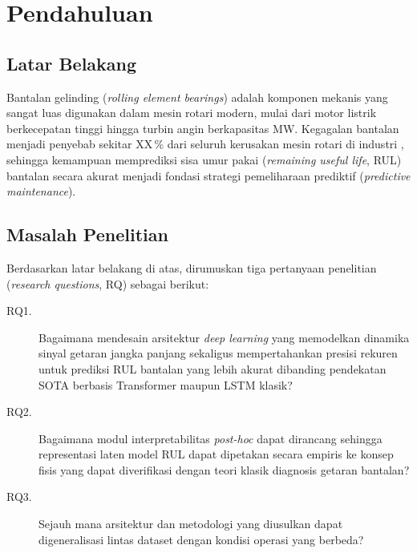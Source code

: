 
\chapter{Pendahuluan}
\label{bab:pendahuluan}

\section{Latar Belakang}
\label{subsec:bab1_latar}

Bantalan gelinding (\emph{rolling element bearings}) adalah komponen
mekanis yang sangat luas digunakan dalam mesin rotari modern, mulai
dari motor listrik berkecepatan tinggi hingga turbin angin
berkapasitas \si{\mega\watt}. Kegagalan bantalan menjadi penyebab
sekitar XX\,\% dari seluruh kerusakan mesin rotari di industri
, sehingga kemampuan memprediksi sisa umur pakai
(\emph{remaining useful life}, RUL) bantalan secara akurat menjadi
fondasi strategi pemeliharaan prediktif (\emph{predictive maintenance}).


\section{Masalah Penelitian}
\label{subsec:bab1_masalah}

Berdasarkan latar belakang di atas, dirumuskan tiga pertanyaan
penelitian (\emph{research questions}, RQ) sebagai berikut:

\begin{description}
  \item[RQ1.] Bagaimana mendesain arsitektur \emph{deep learning} yang
        memodelkan dinamika sinyal getaran jangka panjang sekaligus
        mempertahankan presisi rekuren untuk prediksi RUL bantalan
        yang lebih akurat dibanding pendekatan SOTA berbasis
        Transformer maupun LSTM klasik?
  \item[RQ2.] Bagaimana modul interpretabilitas \emph{post-hoc} dapat
        dirancang sehingga representasi laten model RUL dapat
        dipetakan secara empiris ke konsep fisis yang dapat
        diverifikasi dengan teori klasik diagnosis getaran bantalan?
  \item[RQ3.] Sejauh mana arsitektur dan metodologi yang diusulkan
        dapat digeneralisasi lintas dataset dengan kondisi operasi
        yang berbeda?
\end{description}

